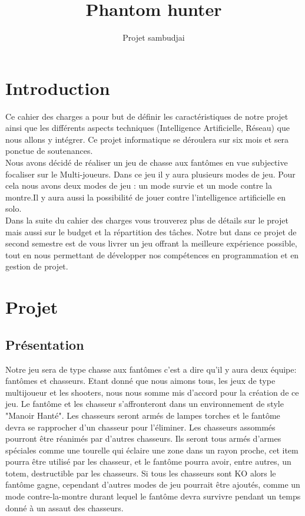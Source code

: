 \documentclass[10pt]{article} %
\title{\Huge Phantom hunter}
\author{Projet sambudjai}
\begin{document}
\maketitle

\newpage

\tableofcontents

\newpage

\section{Introduction}


Ce cahier des charges a pour but de définir les caractéristiques de notre projet ainsi que les différents aspects techniques (Intelligence Artificielle, Réseau) que nous allons y intégrer. Ce projet informatique se déroulera sur six mois et sera ponctue de soutenances.\\

Nous avons décidé de réaliser un jeu de chasse aux fantômes en vue subjective focaliser sur le 
 Multi-joueurs. Dans ce jeu il y aura plusieurs modes de jeu. Pour cela nous avons deux modes de jeu : un mode survie et un mode contre la montre.Il y aura aussi la possibilité de jouer contre l'intelligence artificielle en solo. \\

Dans la suite du cahier des charges vous trouverez plus de détails sur le projet mais aussi sur le budget et la répartition des tâches.
Notre but dans ce projet de second semestre est de vous livrer un jeu offrant la meilleure expérience possible, tout en nous permettant de développer nos compétences en programmation et en gestion de projet.

\newpage


\section{Projet}



\subsection{Présentation}

Notre jeu sera de type chasse aux fantômes c'est a dire qu'il y aura deux équipe: fantômes et chasseurs.
Etant donné que nous aimons tous, les jeux de type multijoueur et les shooters, nous  nous somme mis d'accord pour la création de ce jeu.
Le fantôme et les chasseur s'affronteront dans un environnement de style "Manoir Hanté". Les chasseurs seront armés de lampes torches et le fantôme devra se rapprocher d'un chasseur pour l'éliminer. Les chasseurs assommés pourront être réanimés par d'autres chasseurs.
Ils seront tous armés d'armes spéciales comme une tourelle qui éclaire une zone dans un rayon proche, cet item pourra être utilisé par les chasseur, et le fantôme pourra avoir, entre autres, un totem, destructible par les chasseurs.      
Si tous les chasseurs sont KO alors le fantôme gagne, cependant d'autres modes de jeu pourrait être ajoutés, comme un mode contre-la-montre durant lequel le fantôme devra survivre pendant un temps donné à un assaut des chasseurs.
\end{document}
